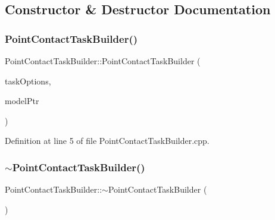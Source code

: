 \subsection{Constructor \& Destructor Documentation}
\hypertarget{classocra_1_1PointContactTaskBuilder_a36712065646f637a772e84443ea6bb44}{}\label{classocra_1_1PointContactTaskBuilder_a36712065646f637a772e84443ea6bb44} 
\subsubsection{\texorpdfstring{Point\+Contact\+Task\+Builder()}{PointContactTaskBuilder()}}
{\footnotesize\ttfamily Point\+Contact\+Task\+Builder\+::\+Point\+Contact\+Task\+Builder (\begin{DoxyParamCaption}\item[{const \hyperlink{classocra_1_1TaskBuilderOptions}{Task\+Builder\+Options} \&}]{task\+Options,  }\item[{Model\+::\+Ptr}]{model\+Ptr }\end{DoxyParamCaption})}



Definition at line 5 of file Point\+Contact\+Task\+Builder.\+cpp.

\hypertarget{classocra_1_1PointContactTaskBuilder_a33923536a7481e117db39cc4bc7a9d75}{}\label{classocra_1_1PointContactTaskBuilder_a33923536a7481e117db39cc4bc7a9d75} 
\subsubsection{\texorpdfstring{$\sim$\+Point\+Contact\+Task\+Builder()}{~PointContactTaskBuilder()}}
{\footnotesize\ttfamily Point\+Contact\+Task\+Builder\+::$\sim$\+Point\+Contact\+Task\+Builder (\begin{DoxyParamCaption}{ }\end{DoxyParamCaption})\hspace{0.3cm}{\ttfamily [virtual]}}




